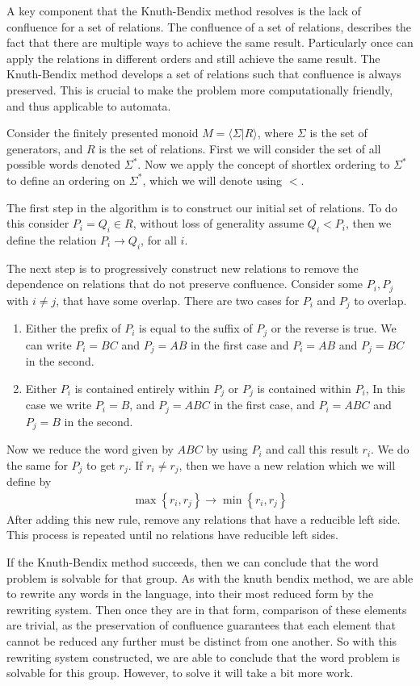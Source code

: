 \documentclass[10pt]{amsart}
\theoremstyle{definition}
\theoremstyle{remark}
\begin{document}
A key component that the Knuth-Bendix method resolves is the lack of
confluence for a set of relations. The confluence of a set of relations,
describes the fact that there are multiple ways to achieve the same result.
Particularly once can apply the relations in different orders and still achieve
the same result. The Knuth-Bendix method develops a set of relations such that
confluence is always preserved. This is crucial to make the problem more
computationally friendly, and thus applicable to automata.

Consider the finitely presented monoid $M=\langle \Sigma\vert R\rangle$, where
$\Sigma$ is the set of generators, and $R$ is the set of relations. First we
will consider the set of all possible words denoted $\Sigma^*$. Now we apply the
concept of shortlex ordering to $\Sigma^*$ to define an ordering on $\Sigma^*$,
which we will denote using $<$.

The first step in the algorithm is to construct our initial set of relations.
To do this consider $P_i=Q_i\in R$, without loss of generality assume
$Q_i<P_i$, then we define the relation $P_i\rightarrow Q_i$, for all $i$.

The next step is to progressively construct new relations to remove the
dependence on relations that do not preserve confluence. Consider some
$P_i,P_j$ with $i\neq j$, that have some overlap. There are two cases for $P_i$
and $P_j$ to overlap.
\begin{enumerate}
  \item Either the prefix of $P_i$ is equal to the suffix of $P_j$ or the
    reverse is true. We can write $P_i=BC$ and $P_j=AB$ in the first case and
    $P_i=AB$ and $P_j=BC$ in the second.
  \item Either $P_i$ is contained entirely within $P_j$ or $P_j$ is contained
    within $P_i$, In this case we write $P_i=B$, and $P_j=ABC$ in the first
    case, and $P_i=ABC$ and $P_j=B$ in the second.
\end{enumerate}
Now we reduce the word given by $ABC$ by using $P_i$ and call this result
$r_i$. We do the same for $P_j$ to get $r_j$. If $r_i\neq r_j$, then we have a
new relation which we will define by
\begin{align*}
  \max\left\{r_i,r_j\right\}\rightarrow\min\left\{r_i,r_j\right\}
\end{align*}
After adding this new rule, remove any relations that have a reducible left
side. This process is repeated until no relations have reducible left sides.

If the Knuth-Bendix method succeeds, then we can conclude that the word problem
is solvable for that group. As with the knuth bendix method, we are able to
rewrite any words in the language, into their most reduced form by the
rewriting system. Then once they are in that form, comparison of these
elements are trivial, as the preservation of confluence guarantees that each
element that cannot be reduced any further must be distinct from one another.
So with this rewriting system constructed, we are able to conclude that the
word problem is solvable for this group. However, to solve it will take a bit
more work.
\end{document}
